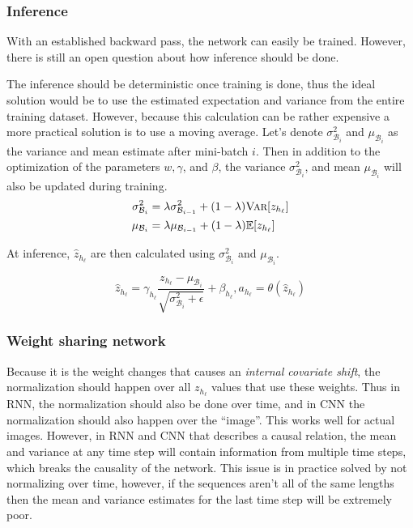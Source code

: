 \subsubsection{Inference}

With an established backward pass, the network can easily be trained. However, there is still an open question about how inference should be done.

The inference should be deterministic once training is done, thus the ideal solution would be to use the estimated expectation and variance from the entire training dataset. However, because this calculation can be rather expensive a more practical solution is to use a moving average. Let's denote $\sigma^2_{\mathcal{B}_i}$ and $\mu_{\mathcal{B}_i}$ as the variance and mean estimate after mini-batch $i$. Then in addition to the optimization of the parameters $w, \gamma$, and $\beta$, the variance $\sigma^2_{\mathcal{B}_i}$, and mean $\mu_{\mathcal{B}_i}$ will also be updated during training.
\begin{equation}
\begin{aligned}
\sigma^2_{\mathcal{B}_i} &= \lambda \sigma^2_{\mathcal{B}_{i-1}} + (1 - \lambda) \textsc{Var}[z_{h_\ell}] \\
\mu_{\mathcal{B}_i} &= \lambda \mu_{\mathcal{B}_{i-1}} + (1 - \lambda) \mathbb{E}[z_{h_\ell}]
\end{aligned}
\end{equation}

At inference, $\hat{z}_{h_\ell}$ are then calculated using $\sigma^2_{\mathcal{B}_i}$ and $\mu_{\mathcal{B}_i}$.

\begin{equation}
\hat{z}_{h_\ell} = \gamma_{h_\ell} \frac{z_{h_\ell} - \mu_{\mathcal{B}_i}}{\sqrt{\sigma^2_{\mathcal{B}_i} + \epsilon}} + \beta_{h_\ell}, a_{h_\ell} = \theta(\hat{z}_{h_\ell})
\end{equation}

\subsubsection{Weight sharing network}

Because it is the weight changes that causes an \textit{internal covariate shift}, the normalization should happen over all $z_{h_\ell}$ values that use these weights. Thus in RNN, the normalization should also be done over time, and in CNN the normalization should also happen over the ``image''. This works well for actual images. However, in RNN and CNN that describes a causal relation, the mean and variance at any time step will contain information from multiple time steps, which breaks the causality of the network. This issue is in practice solved by not normalizing over time, however, if the sequences aren't all of the same lengths then the mean and variance estimates for the last time step will be extremely poor.

